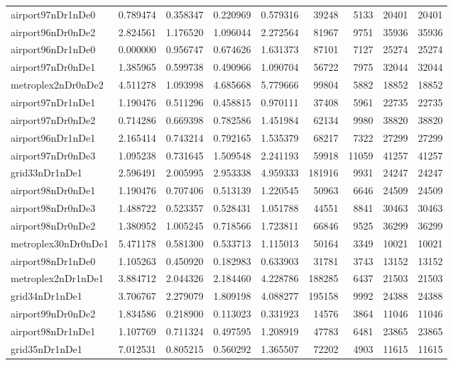 \begin{longtable}{|l|r|r|r|r|r|r|r|r|}
airport97nDr1nDe0 & 0.789474 & 0.358347 & 0.220969 & 0.579316 & 39248 & 5133 & 20401 & 20401 \\
airport96nDr0nDe2 & 2.824561 & 1.176520 & 1.096044 & 2.272564 & 81967 & 9751 & 35936 & 35936 \\
airport96nDr1nDe0 & 0.000000 & 0.956747 & 0.674626 & 1.631373 & 87101 & 7127 & 25274 & 25274 \\
airport97nDr0nDe1 & 1.385965 & 0.599738 & 0.490966 & 1.090704 & 56722 & 7975 & 32044 & 32044 \\
metroplex2nDr0nDe2 & 4.511278 & 1.093998 & 4.685668 & 5.779666 & 99804 & 5882 & 18852 & 18852 \\
airport97nDr1nDe1 & 1.190476 & 0.511296 & 0.458815 & 0.970111 & 37408 & 5961 & 22735 & 22735 \\
airport97nDr0nDe2 & 0.714286 & 0.669398 & 0.782586 & 1.451984 & 62134 & 9980 & 38820 & 38820 \\
airport96nDr1nDe1 & 2.165414 & 0.743214 & 0.792165 & 1.535379 & 68217 & 7322 & 27299 & 27299 \\
airport97nDr0nDe3 & 1.095238 & 0.731645 & 1.509548 & 2.241193 & 59918 & 11059 & 41257 & 41257 \\
grid33nDr1nDe1 & 2.596491 & 2.005995 & 2.953338 & 4.959333 & 181916 & 9931 & 24247 & 24247 \\
airport98nDr0nDe1 & 1.190476 & 0.707406 & 0.513139 & 1.220545 & 50963 & 6646 & 24509 & 24509 \\
airport98nDr0nDe3 & 1.488722 & 0.523357 & 0.528431 & 1.051788 & 44551 & 8841 & 30463 & 30463 \\
airport98nDr0nDe2 & 1.380952 & 1.005245 & 0.718566 & 1.723811 & 66846 & 9525 & 36299 & 36299 \\
metroplex30nDr0nDe1 & 5.471178 & 0.581300 & 0.533713 & 1.115013 & 50164 & 3349 & 10021 & 10021 \\
airport98nDr1nDe0 & 1.105263 & 0.450920 & 0.182983 & 0.633903 & 31781 & 3743 & 13152 & 13152 \\
metroplex2nDr1nDe1 & 3.884712 & 2.044326 & 2.184460 & 4.228786 & 188285 & 6437 & 21503 & 21503 \\
grid34nDr1nDe1 & 3.706767 & 2.279079 & 1.809198 & 4.088277 & 195158 & 9992 & 24388 & 24388 \\
airport99nDr0nDe2 & 1.834586 & 0.218900 & 0.113023 & 0.331923 & 14576 & 3864 & 11046 & 11046 \\
airport98nDr1nDe1 & 1.107769 & 0.711324 & 0.497595 & 1.208919 & 47783 & 6481 & 23865 & 23865 \\
grid35nDr1nDe1 & 7.012531 & 0.805215 & 0.560292 & 1.365507 & 72202 & 4903 & 11615 & 11615 \\

\end{longtable}
